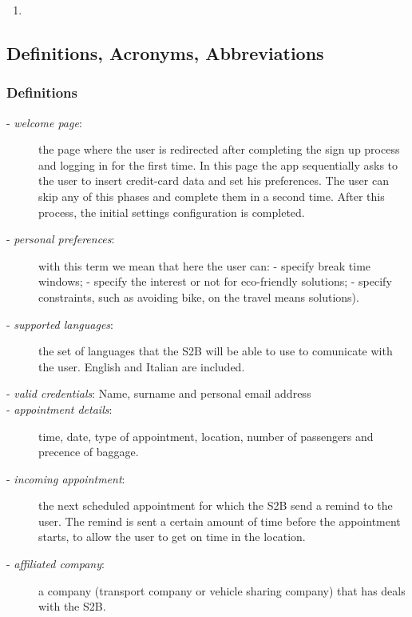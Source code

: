 \begin{enumerate}[label={[G\arabic*]}]
		\item {}
		\item {}
		\item {}
		\begin{enumerate}[label=\theenumi\#{\arabic*}]
			\item {}
		\end{enumerate}
	\end{enumerate}

\subsection{Definitions, Acronyms, Abbreviations}
	\subsubsection{Definitions}
		\begin{description}
			\item[- \textit{welcome page}:] the page where the user is redirected after completing the sign up process and logging in for the first time. In this page the app sequentially  asks to the user to insert credit-card data and set his preferences. The user can skip any of this phases and complete them in a second time. After this process, the initial settings configuration is completed.
			\item[- \textit{personal preferences}:] with this term we mean that here the user can:\newline
			- specify break time windows; \newline
			- specify the interest or not for eco-friendly solutions;\newline
			- specify constraints, such as avoiding  bike, on the travel means solutions).
			\item[- \textit{supported languages}:] the set of languages that the S2B will be able to use to comunicate with the user. English and Italian are included.
			\item[- \textit{valid credentials}: Name, surname and personal email address]
			\item[- \textit{appointment details}:] time, date, type of appointment, location, number of passengers and precence of baggage.
			\item[- \textit{incoming appointment}:] the next scheduled appointment for which the S2B send a remind to the user. The remind is sent  a certain amount of time before the appointment starts, to allow the user to get on time in the location.
			\item[- \textit{affiliated company}:] a company (transport company or vehicle sharing company) that has deals with the S2B.
		\end{description}
